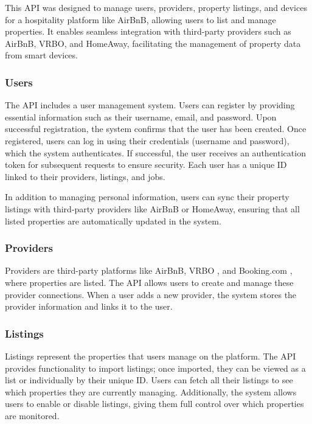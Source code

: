 This API was designed to manage users, providers, property listings, and devices for a hospitality platform like AirBnB, 
allowing users to list and manage properties. It enables seamless integration with third-party providers such as AirBnB, 
VRBO, and HomeAway, facilitating the management of property data from smart devices.

\subsubsection{Users}

The API includes a user management system. Users can register by providing essential information such as their username, 
email, and password. Upon successful registration, the system confirms that the user has been created. Once registered, 
users can log in using their credentials (username and password), which the system authenticates. If successful, the 
user receives an authentication token for subsequent requests to ensure security. Each user has a unique ID linked to 
their providers, listings, and jobs.

In addition to managing personal information, users can sync their property listings with third-party providers like 
AirBnB or HomeAway, ensuring that all listed properties are automatically updated in the system.

\subsubsection{Providers}

Providers are third-party platforms like AirBnB, VRBO \cite{VRBO2024}, and Booking.com \cite{Booking2024}, where 
properties are listed. The API allows users to create and manage these provider connections. When a user adds a new 
provider, the system stores the provider information and links it to the user.

\subsubsection{Listings}

Listings represent the properties that users manage on the platform. The API provides functionality to import listings; 
once imported, they can be viewed as a list or individually by their unique ID. Users can fetch all their listings to 
see which properties they are currently managing. Additionally, the system allows users to enable or disable listings, 
giving them full control over which properties are monitored.

